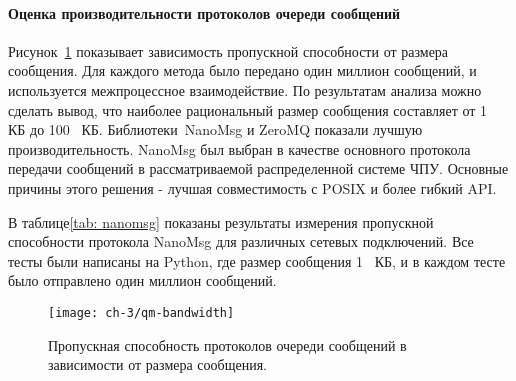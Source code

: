 \paragraph{Оценка производительности протоколов очереди сообщений}

Рисунок~\cref{fig:qm-bandwidth} показывает зависимость пропускной способности от размера сообщения. Для каждого метода было передано один миллион сообщений, и используется межпроцессное взаимодействие. По результатам анализа можно сделать вывод, что наиболее рациональный размер сообщения составляет от 1 \, КБ до 100 \, КБ.
Библиотеки~NanoMsg и ZeroMQ показали лучшую производительность. NanoMsg был выбран в качестве основного протокола передачи сообщений в рассматриваемой распределенной системе ЧПУ. Основные причины этого решения - лучшая совместимость с POSIX и более гибкий API.


В таблице\cref{tab: nanomsg} показаны результаты измерения пропускной способности протокола NanoMsg для различных сетевых подключений. Все тесты были написаны на Python, где размер сообщения 1 \, КБ, и в каждом тесте было отправлено один миллион сообщений.

%
%


\begin{figure}[!htb]
	\centering
	\texttt{[image: ch-3/qm-bandwidth]}
	\caption{Пропускная способность протоколов очереди сообщений в зависимости от размера сообщения.}
	\label{fig:qm-bandwidth}
\end{figure}

